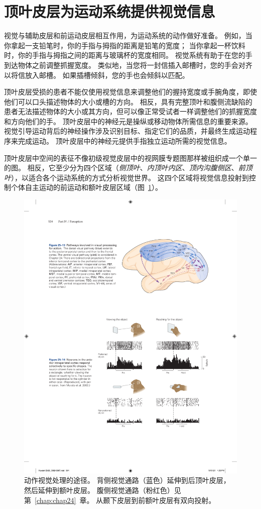 \section{顶叶皮层为运动系统提供视觉信息}

视觉与辅助皮层和前运动皮层相互作用，为运动系统的动作做好准备。
例如，当你拿起一支铅笔时，你的手指与拇指的距离是铅笔的宽度；
当你拿起一杯饮料时，你的手指与拇指之间的距离与玻璃杯的宽度相同。
视觉系统有助于在您的手到达物体之前调整抓握宽度。
类似地，当您将一封信插入邮槽时，您的手会对齐以将信放入邮槽。
如果插槽倾斜，您的手也会倾斜以匹配。


顶叶皮层受损的患者不能仅使用视觉信息来调整他们的握持宽度或手腕角度，即使他们可以口头描述物体的大小或槽的方向。
相反，具有完整顶叶和腹侧流缺陷的患者无法描述物体的大小或其方向，但可以像正常受试者一样调整他们的抓握宽度和方向他们的手。
顶叶皮层中的神经元是操纵或移动物体所需信息的重要来源。
视觉引导运动背后的神经操作涉及识别目标、指定它们的品质，并最终生成运动程序来完成运动。
顶叶皮层中的神经元提供手指独立运动所需的视觉信息。


顶叶皮层中空间的表征不像初级视觉皮层中的视网膜专题图那样被组织成一个单一的图。
相反，它至少分为四个区域（\textit{侧顶叶}、\textit{内顶叶内区}、\textit{顶内沟腹侧区}、\textit{前顶叶}），以适合各个运动系统的方式分析视觉世界。
这四个区域将视觉信息投射到控制个体自主运动的前运动和额叶皮层区域（图~\ref{fig:25_13}）。


\begin{figure}[htbp]
	\centering
	\includegraphics[width=0.65\linewidth]{chap25/fig_25_13}
	\caption{动作视觉处理的途径。
		背侧视觉通路（蓝色）延伸到后顶叶皮层，然后延伸到额叶皮层。
		腹侧视觉通路（粉红色）见第~\ref{chap:chap24}~章。
		从颞下皮层到前额叶皮层有双向投射。}
	\label{fig:25_13}
\end{figure}


